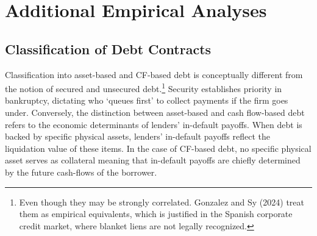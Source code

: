 \documentclass[12pt]{article}
\begin{document}
\begin{table}[H]
    \centering
    \caption{\small Summary Statistics - debt contracts between 2010Q1 and 2023Q2}
    \label{tab:sumstat2}
\end{table}

\section{Additional Empirical Analyses}

\subsection{Classification of Debt Contracts \label{sec:classification}}
Classification into asset-based and CF-based debt is conceptually different from the notion of secured and unsecured debt.\footnote{Even though they may be strongly correlated. Gonzalez and Sy (2024) treat them as empirical equivalents, which is justified in the Spanish corporate credit market, where blanket liens are not legally recognized.} Security establishes priority in bankruptcy, dictating who `queues first' to collect payments if the firm goes under. Conversely, the distinction between asset-based and cash flow-based debt refers to the economic determinants of lenders' in-default payoffs. When debt is backed by specific physical assets, lenders' in-default payoffs reflect the liquidation value of these items. In the case of CF-based debt, no specific physical asset serves as collateral meaning that in-default payoffs are chiefly determined by the future cash-flows of the borrower. 
\end{document}
